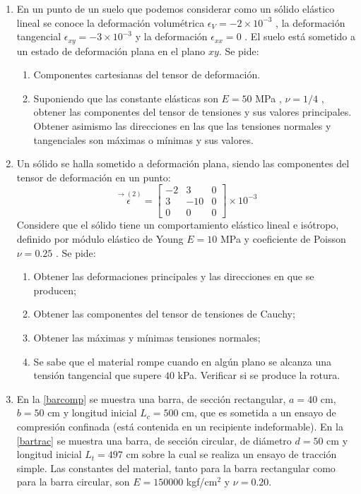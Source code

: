 \documentclass[../notas medios.tex]{subfiles}
\begin{document}
\begin{enumerate}
\item \label{punto06_m} En un punto de un suelo que podemos considerar como un sólido elástico lineal se conoce la deformación volumétrica $\epsilon_V = -2\times10^{-3}$ , la deformación tangencial $\epsilon_{xy} = - 3 \times 10^{-3}$ y la deformación  $\epsilon_{xx} = 0$ . El suelo está sometido a un estado de deformación plana en el plano $x y$. Se pide:
\begin{enumerate}
\item Componentes cartesianas del tensor de deformación.
\item  Suponiendo que las constante elásticas son $E = 50$ MPa , $\nu =1/4$ , obtener las componentes del tensor de tensiones y sus valores principales. Obtener asimismo las direcciones en las que las tensiones normales y tangenciales son máximas o mínimas y sus valores.
\end{enumerate}

\item \label{punto07_m} Un sólido se halla sometido a deformación plana, siendo las componentes del tensor de deformación en un punto:
\[\overset{\rightarrow (2)}\epsilon = \left[ \begin{array}{ccc}
-2 & 3 & 0 \\
3 & -10 & 0 \\
0 & 0 & 0
\end{array}  \right] \times 10^{-3}\]
Considere que el sólido tiene un comportamiento elástico lineal e isótropo, definido por
módulo elástico de Young $E = 10$ MPa y coeficiente de Poisson $\nu = 0.25$ .
Se pide:
\begin{enumerate}
\item Obtener las deformaciones principales y las direcciones en que se producen;
\item Obtener las componentes del tensor de tensiones de Cauchy;
\item Obtener las máximas y mínimas tensiones normales;
\item Se sabe que el material rompe cuando en algún plano se alcanza una tensión tangencial
que supere $40$ kPa. Verificar si se produce la rotura.
\end{enumerate}

\item \label{punto08_m}  En la \cref{barcomp}  se muestra una barra, de sección rectangular, $a= 40$ cm, $b = 50$ cm y longitud inicial $L_{c} = 500$ cm, que es  sometida a un ensayo de compresión confinada (está contenida en un recipiente indeformable). En la \cref{bartrac} se muestra una barra, de sección circular, de diámetro $d = 50$ cm y longitud inicial $L_{t} =497$ cm sobre la cual se realiza  un ensayo de tracción simple. Las constantes del material, tanto para la barra rectangular como para la barra circular, son $E=150000$ kgf/cm$^2$ y $\nu=0.20$.


\end{enumerate}
\end{document}
